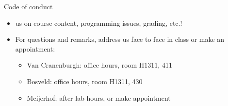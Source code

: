 \documentclass[aspectratio=169,usenames,dvipsnames]{beamer}
\begin{document}
\begin{frame}{Code of conduct}
    \begin{itemize}
        \item {} us on course content,
            programming issues, grading, etc.!
        \item For questions and remarks, address us face to face in class
            or make an appointment:
            \begin{itemize}
                \item Van Cranenburgh: office hours, room H1311, 411
                \item Bosveld: office hours, room H1311, 430
                \item Meijerhof; after lab hours, or make appointment
            \end{itemize}
    \end{itemize}
\end{frame}
\end{document}
